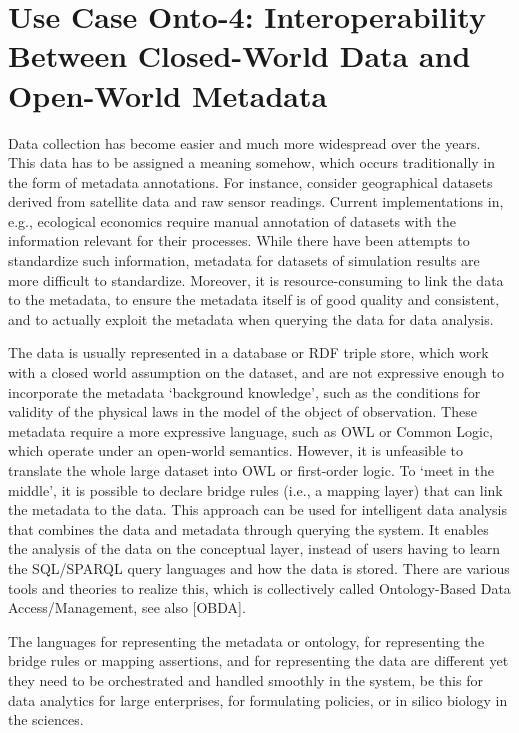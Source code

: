 \documentclass[10pt,fleqn,%
\ifpretendfinal
final%
\else
draft%
\fi,
]{scrreprt}
\newcommand*{\termref}[1]{\index{#1}#1\xspace}
\begin{document}
 

\section{Use Case Onto-4: Interoperability Between Closed-World Data and Open-World Metadata}
Data collection has become easier and much more widespread over the years. This data has to be 
assigned a meaning somehow, which occurs traditionally in the  form of metadata annotations. For 
instance, consider geographical datasets derived from satellite data and raw sensor readings. 
Current implementations in, e.g., ecological economics\cite{bagstad_aries_2011} require manual 
annotation of datasets with the information relevant for their processes. While there have been 
attempts to standardize such information\cite{european_comission_inspire_2014}, metadata for 
datasets of simulation results are more difficult to standardize. Moreover, it is 
resource-consuming to link the data to the metadata, to ensure the metadata itself is of good 
quality and consistent, and to actually exploit the metadata when querying the data for data 
analysis. 

The data is usually represented in a database or RDF triple store, which work with a \termref{closed world assumption} on the dataset, and are not expressive enough to 
incorporate the metadata `background knowledge', such as the conditions for validity of the physical laws in the model of the object of observation. These metadata 
require a more expressive language, such as OWL or Common Logic, which operate under an open-world semantics. However, it is unfeasible to translate the 
whole large dataset into OWL or first-order logic. To `meet in the middle', it is possible to declare bridge rules (i.e., a mapping layer) that can link the metadata to 
the data. This approach can be used for intelligent data analysis that combines the data and metadata through querying the system. It enables the analysis of the 
data on the conceptual layer, instead of users having to learn the SQL/SPARQL query languages and how the data is stored. There are various tools and theories 
to realize this, which is collectively called Ontology-Based Data Access/Management, see also [OBDA].

The languages for representing the metadata or ontology, for representing the bridge rules or mapping assertions, and for representing the data are different yet 
they need to be orchestrated and handled smoothly in the system, be this for data analytics for large enterprises, for formulating policies, or in silico biology in the 
sciences. 
\end{document}
